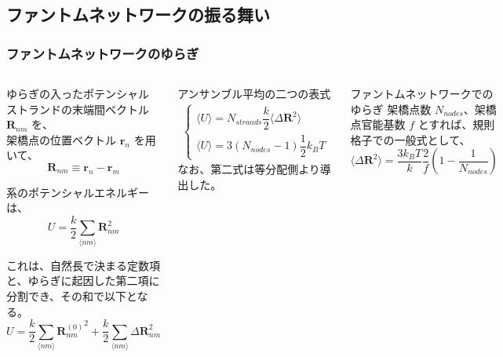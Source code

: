 \documentclass[11pt, dvipdfmx]{beamer}
\begin{document}
\subsection{ファントムネットワークの振る舞い}
\begin{frame}
\frametitle{ファントムネットワークのゆらぎ}

\begin{columns}[totalwidth=1\textwidth]
\scriptsize
\begin{block}{ゆらぎの入ったポテンシャル}
ストランドの末端間ベクトル $\bm{R}_{nm}$ を、\\架橋点の位置ベクトル $\bm{r}_n$ を用いて、
\vspace{-3mm}
\begin{equation*}
\bm{R}_{nm} \equiv \bm{r}_n-\bm{r}_m
\end{equation*}

系のポテンシャルエネルギーは、
\vspace{-3mm}
\begin{equation*}
U=\dfrac{k}{2} \sum_{\langle nm \rangle} \bm{R}_{nm}^2
\end{equation*}

これは、自然長で決まる定数項と、ゆらぎに起因した第二項に分割でき、その和で以下となる。
\vspace{-3mm}
\begin{equation*}
U=\dfrac{k}{2} \sum_{\langle nm \rangle} {\bm{R}_{nm}^{(0)}}^2 + \dfrac{k}{2} \sum_{\langle nm \rangle} \Delta \bm{R}_{nm}^2
\end{equation*}
\end{block}

\scriptsize
\begin{block}{アンサンブル平均の二つの表式}
\vspace{-5mm}
\begin{align*}
 \begin{cases}
	\langle U \rangle = N_{strands} \dfrac{k}{2} \langle \Delta \bm{R}^2 \rangle \\
	\langle U \rangle = 3(N_{nodes}-1) \dfrac{1}{2} k_B T
 \end{cases}
\end{align*}
なお、第二式は等分配側より導出した。
\end{block}

\begin{exampleblock}{ファントムネットワークでのゆらぎ}
架橋点数 $N_{nodes}$、架橋点官能基数 $f$ とすれば、規則格子での一般式として、
\vspace{-3mm}
\begin{equation*}
\langle \Delta \bm{R}^2 \rangle = \dfrac{3k_B T}{k} \dfrac{2}{f} \left( 1-\dfrac{1}{N_{nodes}} \right)
\end{equation*}


\end{exampleblock}
\end{columns}
\end{frame}
\end{document}

